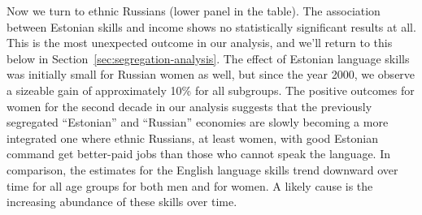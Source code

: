 \documentclass[12pt, a4paper]{article}
\begin{document}
Now we turn to ethnic Russians (lower panel in the table). The association between Estonian skills and income shows no
statistically significant results at all. This is the most unexpected
outcome in our analysis, and we'll return to this
below in Section~\ref{sec:segregation-analysis}.
The effect of Estonian language skills was initially small for Russian
women as well, but
since the year 2000, we observe a sizeable gain of approximately
10\% for all subgroups.
The positive outcomes for women for the second decade in our analysis
suggests that the previously segregated ``Estonian'' and ``Russian''
economies are slowly becoming a more integrated one where ethnic
Russians, at least women, with good Estonian command get better-paid
jobs than those who cannot speak the language.
In comparison, the estimates for the English language skills trend downward over
time for all age groups for both men and for women. A likely
cause is the increasing abundance of these skills over time.
\end{document}

